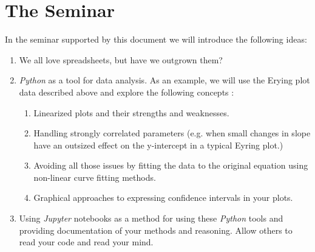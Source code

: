 \documentclass{tufte-handout}
\begin{document}
\section{The Seminar}

In the seminar supported by this document we will introduce the following ideas:

\begin{enumerate}

\item We all love spreadsheets, but have we outgrown them?

\item \textit{Python} as a tool for data analysis. As an example, we will use the Erying plot data described above and explore the following concepts
:

\begin{enumerate}

\item Linearized plots and their strengths and weaknesses.
\item Handling strongly correlated parameters (e.g. when small changes in slope have an outsized effect on the y-intercept in a typical Eyring plot.)
\item Avoiding all those issues by fitting the data to the original equation using non-linear curve fitting methods.
\item Graphical approaches to expressing confidence intervals in your plots.

\end{enumerate}

\item Using \textit{Jupyter} notebooks as a method for using these \textit{Python} tools and providing documentation of your methods and reasoning. Allow others to read your code and read your mind.

\end{enumerate}


\nobibliography{}
\end{document}
